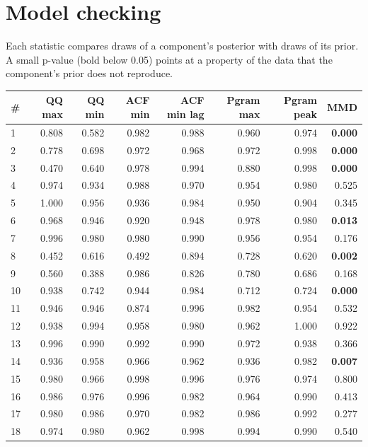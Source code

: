 \documentclass[11pt,a4paper]{article}
\begin{document}
\section*{Model checking}

Each statistic compares draws of a component's posterior with draws of its prior. A small p-value (bold below 0.05) points at a property of the data that the component's prior does not reproduce.

\begin{center}
\begin{tabular}{lrrrrrrr}
\toprule
\# & QQ max & QQ min & ACF min & ACF min lag & Pgram max & Pgram peak & MMD \\
\midrule
1 & 0.808 & 0.582 & 0.982 & 0.988 & 0.960 & 0.974 & \textbf{0.000} \\
2 & 0.778 & 0.698 & 0.972 & 0.968 & 0.972 & 0.998 & \textbf{0.000} \\
3 & 0.470 & 0.640 & 0.978 & 0.994 & 0.880 & 0.998 & \textbf{0.000} \\
4 & 0.974 & 0.934 & 0.988 & 0.970 & 0.954 & 0.980 & 0.525 \\
5 & 1.000 & 0.956 & 0.936 & 0.984 & 0.950 & 0.904 & 0.345 \\
6 & 0.968 & 0.946 & 0.920 & 0.948 & 0.978 & 0.980 & \textbf{0.013} \\
7 & 0.996 & 0.980 & 0.980 & 0.990 & 0.956 & 0.954 & 0.176 \\
8 & 0.452 & 0.616 & 0.492 & 0.894 & 0.728 & 0.620 & \textbf{0.002} \\
9 & 0.560 & 0.388 & 0.986 & 0.826 & 0.780 & 0.686 & 0.168 \\
10 & 0.938 & 0.742 & 0.944 & 0.984 & 0.712 & 0.724 & \textbf{0.000} \\
11 & 0.946 & 0.946 & 0.874 & 0.996 & 0.982 & 0.954 & 0.532 \\
12 & 0.938 & 0.994 & 0.958 & 0.980 & 0.962 & 1.000 & 0.922 \\
13 & 0.996 & 0.990 & 0.992 & 0.990 & 0.972 & 0.938 & 0.366 \\
14 & 0.936 & 0.958 & 0.966 & 0.962 & 0.936 & 0.982 & \textbf{0.007} \\
15 & 0.980 & 0.966 & 0.998 & 0.996 & 0.976 & 0.974 & 0.800 \\
16 & 0.986 & 0.976 & 0.996 & 0.982 & 0.964 & 0.990 & 0.413 \\
17 & 0.980 & 0.986 & 0.970 & 0.982 & 0.986 & 0.992 & 0.277 \\
18 & 0.974 & 0.980 & 0.962 & 0.998 & 0.994 & 0.990 & 0.540 \\

\end{tabular}
\end{center}
\end{document}
